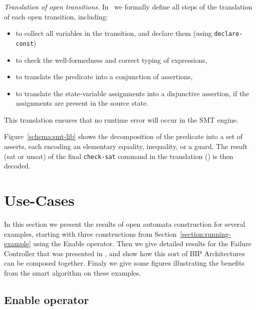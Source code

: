 \documentclass[smallcondensed]{svjour3}
\begin{document}
\emph{Translation of open transitions.}
In~\cite{Avocs-RR} we formally define all steps of the translation of each
open transition, including:
%
\begin{itemize}
	\item to collect all variables in the transition, and declare them (using \texttt{declare-const})
	\item to check the well-formedness and correct typing of expressions,
	\item to translate the predicate into a conjunction of assertions,
	\item to translate the state-variable
	assignments into a disjunctive assertion, if the assignments are present in the source state.
\end{itemize}
%
This translation ensures that no runtime error will occur
in the SMT engine.

Figure~\ref{schema:smt-lib} shows the decomposition of the
predicate into a set of asserts, each encoding an elementary equality,
inequality, or a guard. 
The result (sat or unsat) of the final \texttt{check-sat} command in
the translation () is then decoded.

\section{Use-Cases}
\label{section:use-cases}
In this section we present the results of open automata construction
for several examples, starting with three constructions from
Section~\ref{section:running-example} using the Enable operator.
Then we give detailed results for the Failure Controller that was
presented in \cite{AVOCS18}, and show how this sort of BIP Architectures
can be composed together.
Finaly we give some figures illustrating the benefits from the smart
algorithm on these examples.

\subsection{Enable operator} 
\label{section:use-case:Enable}
\end{document}
